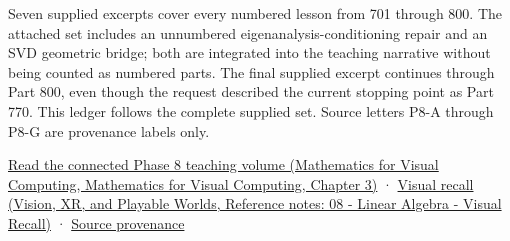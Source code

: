 Seven supplied excerpts cover every numbered lesson from 701 through 800. The attached set includes an unnumbered eigenanalysis-conditioning repair and an SVD geometric bridge; both are integrated into the teaching narrative without being counted as numbered parts. The final supplied excerpt continues through Part 800, even though the request described the current stopping point as Part 770. This ledger follows the complete supplied set. Source letters P8-A through P8-G are provenance labels only.

\href{../02-Mathematics-for-Visual-Computing/main.pdf\#nameddest=01-foundations-i-ch019-the-graphics-problem-hiding-inside-a-matrix-equation}{Read the connected Phase 8 teaching volume (Mathematics for Visual Computing, Mathematics for Visual Computing, Chapter 3)} · \href{../07-Vision-XR-and-Playable-Worlds/main.pdf\#nameddest=appendix-932cf7182ff1}{Visual recall (Vision, XR, and Playable Worlds, Reference notes: 08 - Linear Algebra - Visual Recall)} · \hyperref[appendix-a103e7846d21-phase-8---source-analysis-and-verification]{Source provenance}

